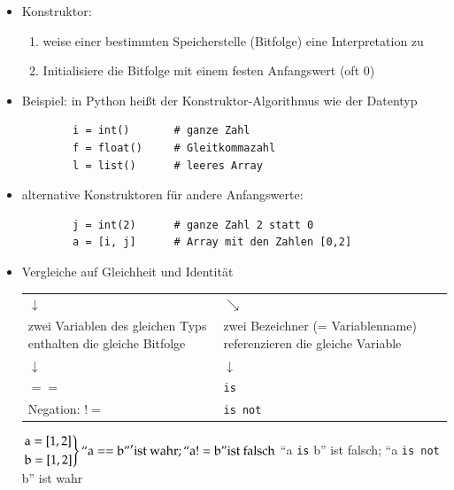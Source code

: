 \begin{itemize}[label={$\bullet$}]
    \item Konstruktor:
    \begin{enumerate}
        \item weise einer bestimmten Speicherstelle (Bitfolge) eine Interpretation zu
        \item Initialisiere die Bitfolge mit einem festen Anfangswert (oft 0)
    \end{enumerate}
    \item[] Beispiel: in Python heißt der Konstruktor-Algorithmus wie der Datentyp \\
    \begin{verbatim}
        i = int()       # ganze Zahl
        f = float()     # Gleitkommazahl
        l = list()      # leeres Array
    \end{verbatim}
    \item[] alternative Konstruktoren für andere Anfangswerte:
    \begin{verbatim}
        j = int(2)      # ganze Zahl 2 statt 0
        a = [i, j]      # Array mit den Zahlen [0,2]
    \end{verbatim}

    \item Vergleiche auf Gleichheit und Identität \\
    \begin{tabular}{C{7cm} C{7cm}}
    $\downarrow$ & $\searrow$ \\
    zwei Variablen des gleichen Typs enthalten die gleiche Bitfolge & zwei Bezeichner (= Variablenname) referenzieren die gleiche Variable \\
    $\downarrow$ & $\downarrow$ \\
    $==$ & \verb|is| \\
    Negation: $!=$ & \verb|is not| \\
    \end{tabular}

    $\begin{rcases}
    \text{a} = [1,2] \\
    \text{b} = [1,2]
    \end{rcases}
    \text{``a} == \text{b''}' \text{ist wahr}; \text{``a} != \text{b''} \text{ist falsch} $ \hspace*{0.6cm}
    ``a \verb|is|  b'' ist falsch; ``a \verb|is not| b'' ist wahr \\


\end{itemize}
